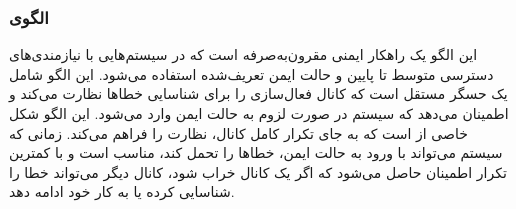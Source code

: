 \subsubsection{الگوی }
\label{archSafeMonActSec}
\begin{RTL}
این الگو \cite{ref4} یک راهکار ایمنی مقرون‌به‌صرفه است که در سیستم‌هایی
با نیازمندی‌های دسترسی متوسط تا پایین و حالت ایمن تعریف‌شده استفاده می‌شود.
این الگو شامل یک حسگر مستقل است که کانال فعال‌سازی
را برای شناسایی خطاها نظارت می‌کند و اطمینان می‌دهد که
سیستم در صورت لزوم به حالت ایمن وارد می‌شود. این الگو شکل
خاصی از  است که به جای تکرار
کامل کانال، نظارت را فراهم می‌کند. زمانی که سیستم می‌تواند با ورود
به حالت ایمن، خطاها را تحمل کند، مناسب است و
با کمترین تکرار اطمینان حاصل می‌شود که اگر یک کانال خراب شود،
کانال دیگر می‌تواند خطا را شناسایی کرده یا به کار خود ادامه دهد.
\end{RTL}